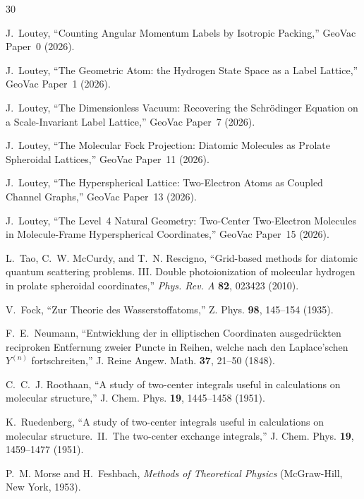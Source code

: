 \documentclass[aps,pra,twocolumn,superscriptaddress,longbibliography]{revtex4-2}
\begin{document}
\begin{thebibliography}{30}

J.~Loutey,
``Counting Angular Momentum Labels by Isotropic Packing,''
GeoVac Paper~0 (2026).

J.~Loutey,
``The Geometric Atom: the Hydrogen State Space as a Label Lattice,''
GeoVac Paper~1 (2026).

J.~Loutey,
``The Dimensionless Vacuum: Recovering the Schr\"odinger Equation
on a Scale-Invariant Label Lattice,''
GeoVac Paper~7 (2026).

J.~Loutey,
``The Molecular Fock Projection: Diatomic Molecules as Prolate
Spheroidal Lattices,''
GeoVac Paper~11 (2026).

J.~Loutey,
``The Hyperspherical Lattice: Two-Electron Atoms as Coupled
Channel Graphs,''
GeoVac Paper~13 (2026).

J.~Loutey,
``The Level~4 Natural Geometry: Two-Center Two-Electron Molecules in
Molecule-Frame Hyperspherical Coordinates,''
GeoVac Paper~15 (2026).

L.~Tao, C.~W. McCurdy, and T.~N. Rescigno,
``Grid-based methods for diatomic quantum scattering problems.
III. Double photoionization of molecular hydrogen in prolate
spheroidal coordinates,''
\emph{Phys. Rev. A} \textbf{82}, 023423 (2010).

V.~Fock,
``Zur Theorie des Wasserstoffatoms,''
Z. Phys. \textbf{98}, 145--154 (1935).

F.~E.~Neumann,
``Entwicklung der in elliptischen Coordinaten ausgedr\"uckten
reciproken Entfernung zweier Puncte in Reihen, welche nach den
Laplace'schen $Y^{(n)}$ fortschreiten,''
J. Reine Angew. Math. \textbf{37}, 21--50 (1848).

C.~C.~J. Roothaan,
``A study of two-center integrals useful in calculations on
molecular structure,''
J. Chem. Phys. \textbf{19}, 1445--1458 (1951).

K.~Ruedenberg,
``A study of two-center integrals useful in calculations on
molecular structure.\ II.\ The two-center exchange integrals,''
J. Chem. Phys. \textbf{19}, 1459--1477 (1951).

P.~M. Morse and H.~Feshbach,
\textit{Methods of Theoretical Physics}
(McGraw-Hill, New York, 1953).


\end{thebibliography}
\end{document}
